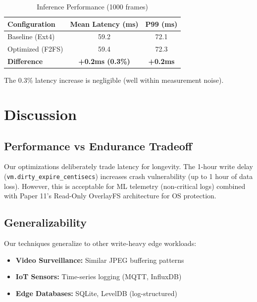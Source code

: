 \documentclass[conference]{IEEEtran}
\begin{document}
\begin{table}[h]
\caption{Inference Performance (1000 frames)}
\begin{center}
\begin{tabular}{lcc}
\toprule
\textbf{Configuration} & \textbf{Mean Latency (ms)} & \textbf{P99 (ms)} \\
\midrule
Baseline (Ext4) & 59.2 & 72.1 \\
Optimized (F2FS) & 59.4 & 72.3 \\
\bottomrule
\textbf{Difference} & \textbf{+0.2ms (0.3\%)} & \textbf{+0.2ms} \\
\end{tabular}
\end{center}
\label{tab:perf}
\end{table}

The 0.3\% latency increase is negligible (well within measurement noise).

\section{Discussion}

\subsection{Performance vs Endurance Tradeoff}

Our optimizations deliberately trade latency for longevity. The 1-hour write delay (\texttt{vm.dirty\_expire\_centisecs}) increases crash vulnerability (up to 1 hour of data loss). However, this is acceptable for ML telemetry (non-critical logs) combined with Paper 11's Read-Only OverlayFS architecture for OS protection.

\subsection{Generalizability}

Our techniques generalize to other write-heavy edge workloads:
\begin{itemize}
    \item \textbf{Video Surveillance:} Similar JPEG buffering patterns
    \item \textbf{IoT Sensors:} Time-series logging (MQTT, InfluxDB)
    \item \textbf{Edge Databases:} SQLite, LevelDB (log-structured)
\end{itemize}
\end{document}
